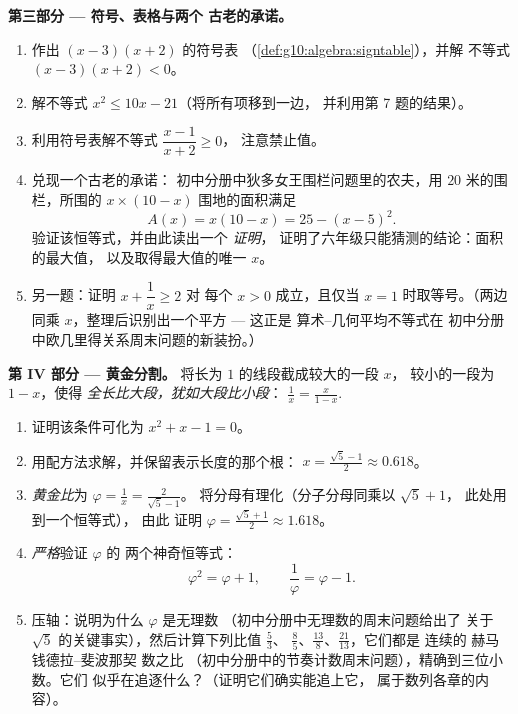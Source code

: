 \begin{problem}[{周末问题 --- 和积问题，
以花拉子米的作图方式配方，以及
方程 $x^2 = x + 1$}]
\medskip
\noindent\textbf{第三部分 --- 符号、表格与两个
古老的承诺。}
\begin{enumerate}[resume]
  \item 作出 $(x - 3)(x + 2)$ 的符号表
        （\cref{def:g10:algebra:signtable}），并解
        不等式 $(x - 3)(x + 2) < 0$。
  \item 解不等式 $x^2 \leq 10x - 21$（将所有项移到一边，
        并利用第 7 题的结果）。
  \item 利用符号表解不等式 $\dfrac{x - 1}{x + 2} \geq 0$，
        注意禁止值。
  \item 兑现一个古老的承诺：
        初中分册中狄多女王围栏问题里的农夫，用 $20$ 米的围栏，所围的
        $x \times (10 - x)$ 围地的面积满足
        \[
        A(x) = x(10 - x) = 25 - (x - 5)^2 .
        \]
        验证该恒等式，并由此读出一个 \emph{证明}，
        证明了六年级只能猜测的结论：面积的最大值，
        以及取得最大值的唯一 $x$。
  \item 另一题：证明 $x + \dfrac1x \geq 2$ 对
        每个 $x > 0$ 成立，且仅当 $x = 1$ 时取等号。（两边同乘
        $x$，整理后识别出一个平方 --- 这正是
        算术--几何平均不等式在
        初中分册中欧几里得关系周末问题的新装扮。）
\end{enumerate}

\medskip
\noindent\textbf{第 IV 部分 --- 黄金分割。}
将长为 $1$ 的线段截成较大的一段 $x$，
较小的一段为 $1 - x$，使得
\emph{全长比大段，犹如大段比小段}：
$\frac{1}{x} = \frac{x}{1 - x}$.
\begin{enumerate}[resume]
  \item 证明该条件可化为 $x^2 + x - 1 = 0$。
  \item 用配方法求解，并保留表示长度的那个根：
        $x = \frac{\sqrt5 - 1}{2} \approx 0.618$。
  \item \emph{黄金比}为 $\varphi = \frac1x = \frac{2}{\sqrt5 - 1}$。
        将分母有理化（分子分母同乘以 $\sqrt5 + 1$，
        此处用到一个恒等式），
        由此
        证明 $\varphi = \frac{\sqrt5 + 1}{2} \approx 1.618$。
  \item \emph{严格}验证 $\varphi$ 的
        两个神奇恒等式：
        \[
        \varphi^2 = \varphi + 1,
        \qquad
        \frac{1}{\varphi} = \varphi - 1 .
        \]
  \item 压轴：说明为什么 $\varphi$ 是无理数
        （初中分册中无理数的周末问题给出了
        关于 $\sqrt5$ 的关键事实），然后计算下列比值 $\frac53$、
        $\frac85$、$\frac{13}{8}$、$\frac{21}{13}$，它们都是
        连续的 赫马钱德拉–斐波那契 数之比
        （初中分册中的节奏计数周末问题），精确到三位小数。它们
        似乎在追逐什么？（证明它们确实能追上它，
        属于数列各章的内容）。
\end{enumerate}
\end{problem}
